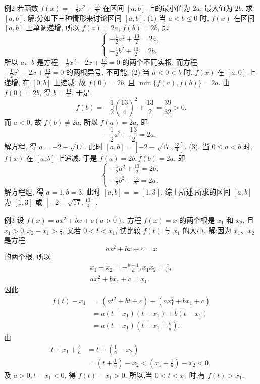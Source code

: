 例2 若函数 $f(x)=-\frac{1}{2} x^2+\frac{13}{2}$ 在区间 $[a, b]$ 上的最小值为 $2 a$, 最大值为 $2 b$, 求 $[a, b]$.
解:分如下三种情形来讨论区间 $[a, b]$.
(1) 当 $a<b \leqslant 0$ 时, $f(x)$ 在区间 $[a, b]$ 上单调递增, 所以 $f(a)=2 a$, $f(b)=2 b$, 即
$$
\left\{\begin{array}{l}
-\frac{1}{2} a^2+\frac{13}{2}=2 a, \\
-\frac{1}{2} b^2+\frac{13}{2}=2 b .
\end{array}\right.
$$
所以 $a 、 b$ 是方程 $-\frac{1}{2} x^2-2 x+\frac{13}{2}=0$ 的两个不同实根, 而方程 $-\frac{1}{2} x^2-2 x+\frac{13}{2}=0$ 的两根异号, 不可能.
(2) 当 $a<0<b$ 时, $f(x)$ 在 $[a, 0]$ 上递增, 在 $[0, b]$ 上递减.
故 $f(0)=2 b$, 且 $\min \{f(a), f(b)\}=2 a$.
由 $f(0)=2 b$, 得 $b=\frac{13}{4}$. 于是
$$
f(b)=-\frac{1}{2}\left(\frac{13}{4}\right)^2+\frac{13}{2}=\frac{39}{32}>0 .
$$
而 $a<0$, 故 $f(b) \neq 2 a$, 所以 $f(a)=2 a$, 即
$$
-\frac{1}{2} a^2+\frac{13}{2}=2 a \text {. }
$$
解方程, 得 $a=-2-\sqrt{17}$. 此时 $[a, b]=\left[-2-\sqrt{17}, \frac{13}{4}\right]$.
(3). 当 $0 \leqslant a<b$ 时, $f(x)$ 在 $[a, b]$ 上递减, 于是 $f(a)=2 b, f(b)=2 a$, 即
$$
\left\{\begin{array}{l}
-\frac{1}{2} a^2+\frac{13}{2}=2 b, \\
-\frac{1}{2} b^2+\frac{13}{2}=2 a .
\end{array}\right.
$$
解方程组, 得 $a=1, b=3$, 此时 $[a, b]==[1,3]$.
综上所述,所求的区间 $[a, b]$ 为 $[1,3]$ 或 $\left[-2-\sqrt{17}, \frac{13}{4}\right]$.



例3 设 $f(x)=a x^2+b x+c(a>0)$, 方程 $f(x)=x$ 的两个根是 $x_1$ 和 $x_2$, 且 $x_1>0, x_2-x_1>\frac{1}{a}$. 又若 $0<t<x_1$, 试比较 $f(t)$ 与 $x_1$ 的大小.
解:因为 $x_1 、 x_2$ 是方程
$$
a x^2+b x+c=x
$$
的两个根, 所以
$$
\begin{gathered}
x_1+x_2=-\frac{b-1}{a}, x_1 x_2=\frac{c}{a}, \\
a x_1^2+b x_1+c=x_1 .
\end{gathered}
$$
因此
$$
\begin{aligned}
f(t)-x_1 & =\left(a t^2+b t+c\right)-\left(a x_1^2+b x_1+c\right) \\
& =a\left(t+x_1\right)\left(t-x_1\right)+b\left(t-x_1\right) \\
& =a\left(t-x_1\right)\left(t+x_1+\frac{b}{a}\right) .
\end{aligned}
$$
由
$$
\begin{aligned}
t+x_1+\frac{b}{a} & =t+\left(\frac{1}{a}-x_2\right) \\
& =\left(t+\frac{1}{a}\right)-x_2<\left(x_1+\frac{1}{a}\right)-x_2<0,
\end{aligned}
$$
及 $a>0, t-x_1<0$, 得 $f(t)-x_1>0$.
所以,当 $0<t<x_1$ 时,有 $f(t)>x_1$.



